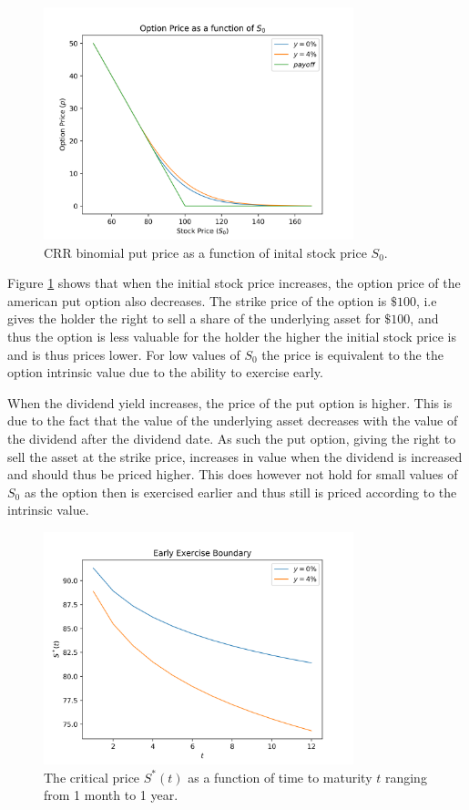 \documentclass{article}
\begin{document}
\begin{figure}[H]
	\centering
	\includegraphics[width=90mm]{images/q3_function_of_S0.png}
	\caption{CRR binomial put price as a function of inital stock price $S_0$.}
	\label{q3S0}
\end{figure}

Figure \ref{q3S0} shows that when the initial stock price increases, the option price of the american put option also decreases. The strike price of the option is $\$100$, i.e gives the holder the right to sell a share of the underlying asset for $\$100$, and thus the option is less valuable for the holder the higher the initial stock price is and is thus prices lower. For low values of $S_0$ the price is equivalent to the the option intrinsic value due to the ability to exercise early. 

When the dividend yield increases, the price of the put option is higher. This is due to the fact that the value of the underlying asset decreases with the value of the dividend after the dividend date. As such the put option, giving the right to sell the asset at the strike price, increases in value when the dividend is increased and should thus be priced higher. This does however not hold for small values of $S_0$ as the option then is exercised earlier and thus still is priced according to the intrinsic value. 

\begin{figure}[H]
	\centering
	\includegraphics[width=90mm]{images/q3_critical.png}
	\caption{The critical price $S^*(t)$ as a function of time to maturity $t$ ranging from 1 month to 1 year.}
	\label{q3Crit}
\end{figure}
\end{document}
